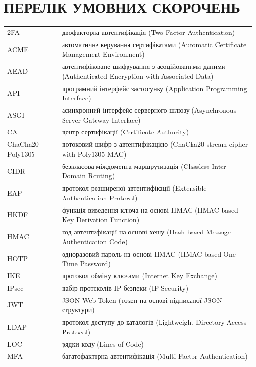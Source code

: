 \chapter*{ПЕРЕЛІК УМОВНИХ СКОРОЧЕНЬ}
\thispagestyle{fancy}

\begin{longtable}{@{}l@{\hspace{1em}}p{\dimexpr\textwidth-5cm\relax}@{}}
  2FA      & двофакторна автентифікація (Two-Factor Authentication) \\
  ACME     & автоматичне керування сертифікатами (Automatic Certificate Management Environment) \\
  AEAD     & автентифіковане шифрування з асоційованими даними (Authenticated Encryption with Associated Data) \\
  API      & програмний інтерфейс застосунку (Application Programming Interface) \\
  ASGI     & асинхронний інтерфейс серверного шлюзу (Asynchronous Server Gateway Interface) \\
  CA       & центр сертифікації (Certificate Authority) \\
  ChaCha20-Poly1305 & потоковий шифр з автентифікацією (ChaCha20 stream cipher with Poly1305 MAC) \\
  CIDR     & безкласова міждоменна маршрутизація (Classless Inter-Domain Routing) \\
  EAP      & протокол розширеної автентифікації (Extensible Authentication Protocol) \\
  HKDF     & функція виведення ключа на основі HMAC (HMAC-based Key Derivation Function) \\
  HMAC     & код автентифікації на основі хешу (Hash-based Message Authentication Code) \\
  HOTP     & одноразовий пароль на основі HMAC (HMAC-based One-Time Password) \\
  IKE      & протокол обміну ключами (Internet Key Exchange) \\
  IPsec    & набір протоколів IP безпеки (IP Security) \\
  JWT      & JSON Web Token (токен на основі підписаної JSON-структури) \\
  LDAP     & протокол доступу до каталогів (Lightweight Directory Access Protocol) \\
  LOC      & рядки коду (Lines of Code) \\
  MFA      & багатофакторна автентифікація (Multi-Factor Authentication) \\

\end{longtable}
